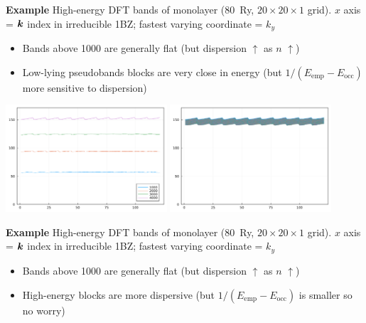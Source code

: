 \documentclass[t]{beamer}
\begin{document}
\begin{frame}[allowframebreaks]
\textbf{Example} High-energy DFT bands of  monolayer 
(\SI{80}{Ry}, $20 \times 20 \times 1$ grid). 
$x$ axis = $\vb*{k}$ index in irreducible 1BZ; 
fastest varying coordinate = $k_y$ 

\vspace{0.5cm}

\begin{itemize}
    \item[\faHandPointRight] Bands above 1000 are generally flat (but dispersion $\uparrow$ as $n$ $\uparrow$)
    \item[\faHandPointRight] Low-lying pseudobands blocks are very close in energy 
    (but $1 / (E_{\text{emp}} - E_{\text{occ}})$ more sensitive to dispersion)
\end{itemize}

\framebreak

\begin{center}
    \includegraphics[width=0.45\textwidth]{../data/energy/energies-different-blocks.png}
    \includegraphics[width=0.45\textwidth]{../data/energy/energies-same-blocks-4000.png}
\end{center}

\textbf{Example} High-energy DFT bands of  monolayer 
(\SI{80}{Ry}, $20 \times 20 \times 1$ grid). 
$x$ axis = $\vb*{k}$ index in irreducible 1BZ; 
fastest varying coordinate = $k_y$ 

\vspace{0.5cm}

\begin{itemize}
    \item[\faHandPointRight] Bands above 1000 are generally flat (but dispersion $\uparrow$ as $n$ $\uparrow$)
    \item[\faHandPointRight] High-energy blocks are more dispersive 
    (but $1 / (E_{\text{emp}} - E_{\text{occ}})$ is smaller so no worry)
\end{itemize}

\end{frame}
\end{document}
